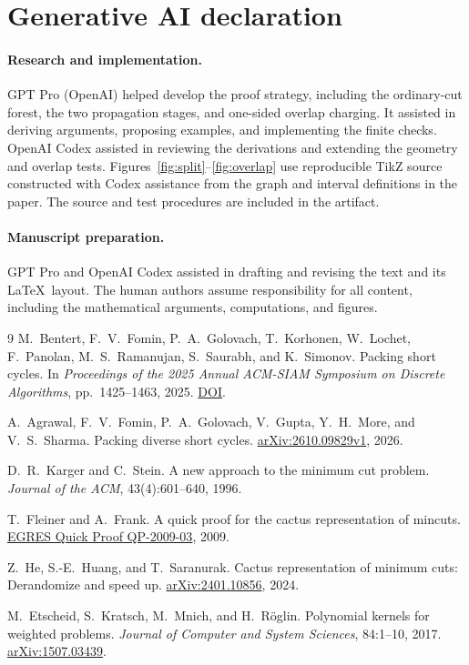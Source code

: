 \documentclass[10pt,letterpaper]{article}
\begin{document}
\clearpage
\section{Generative AI declaration}\label{sec:ai}
\paragraph{Research and implementation.}
GPT Pro (OpenAI) helped develop the proof strategy, including the ordinary-cut forest, the two propagation stages, and one-sided overlap charging. It assisted in deriving arguments, proposing examples, and implementing the finite checks. OpenAI Codex assisted in reviewing the derivations and extending the geometry and overlap tests. Figures~\ref{fig:split}--\ref{fig:overlap} use reproducible TikZ source constructed with Codex assistance from the graph and interval definitions in the paper. The source and test procedures are included in the artifact.

\paragraph{Manuscript preparation.}
GPT Pro and OpenAI Codex assisted in drafting and revising the text and its \LaTeX\ layout. The human authors assume responsibility for all content, including the mathematical arguments, computations, and figures.

\begin{thebibliography}{9}
M.~Bentert, F.~V.~Fomin, P.~A.~Golovach, T.~Korhonen, W.~Lochet,
F.~Panolan, M.~S.~Ramanujan, S.~Saurabh, and K.~Simonov.
Packing short cycles.
In \emph{Proceedings of the 2025 Annual ACM-SIAM Symposium on Discrete Algorithms},
pp.~1425--1463, 2025.
\href{https://doi.org/10.1137/1.9781611978322.45}{DOI}.

A.~Agrawal, F.~V.~Fomin, P.~A.~Golovach, V.~Gupta, Y.~H.~More, and V.~S.~Sharma.
Packing diverse short cycles.
\href{https://arxiv.org/abs/2610.09829v1}{arXiv:2610.09829v1}, 2026.

D.~R.~Karger and C.~Stein.
A new approach to the minimum cut problem.
\emph{Journal of the ACM}, 43(4):601--640, 1996.

T.~Fleiner and A.~Frank.
A quick proof for the cactus representation of mincuts.
\href{https://egres.elte.hu/qp/egresqp-09-03.pdf}{EGRES Quick Proof QP-2009-03}, 2009.

Z.~He, S.-E.~Huang, and T.~Saranurak.
Cactus representation of minimum cuts: Derandomize and speed up.
\href{https://arxiv.org/abs/2401.10856}{arXiv:2401.10856}, 2024.

M.~Etscheid, S.~Kratsch, M.~Mnich, and H.~R\"oglin.
Polynomial kernels for weighted problems.
\emph{Journal of Computer and System Sciences}, 84:1--10, 2017.
\href{https://arxiv.org/abs/1507.03439}{arXiv:1507.03439}.
\end{thebibliography}
\end{document}
